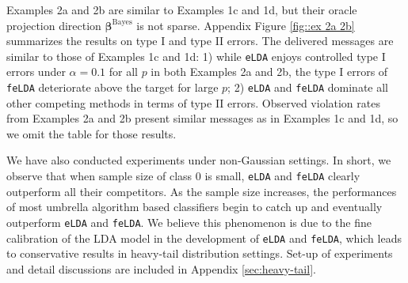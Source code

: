 \documentclass[12pt]{article}
\numberwithin{equation}{section}
\theoremstyle{remark}
\newcommand{\1}{{\rm 1}\kern-0.24em{\rm I}}
\begin{document}

Examples 2a and 2b are similar to Examples 1c and 1d, but their oracle projection direction $\bm{\beta}^{\text{Bayes}}$ is not sparse.  Appendix Figure \ref{fig::ex 2a 2b} summarizes the results on type I and type II errors. The delivered messages are similar to those of Examples 1c and 1d: 1) while \verb+eLDA+ enjoys controlled type I errors under $\alpha=0.1$ for all $p$ in both Examples 2a and 2b,  the type I errors of \verb+feLDA+ deteriorate above the target  for large $p$;  2) \verb+eLDA+ and  \verb+feLDA+ dominate all other competing methods in terms of type II errors.  Observed violation rates from Examples 2a and 2b present similar messages as in Examples 1c and 1d, so we omit the table for those results.

We have also conducted experiments under non-Gaussian settings.  In short, we observe that when sample size of class 0 is small,  \verb+eLDA+ and \verb+feLDA+ clearly outperform all their competitors.  As the sample size increases,  the performances of most umbrella algorithm based classifiers begin to catch up and eventually outperform  \verb+eLDA+ and \verb+feLDA+.  We believe this phenomenon is due to the fine calibration of the LDA model in the development of \verb+eLDA+ and \verb+feLDA+, which leads to conservative results in heavy-tail distribution settings.  Set-up of experiments and detail discussions are included in Appendix \ref{sec:heavy-tail}.
 
\end{document}
